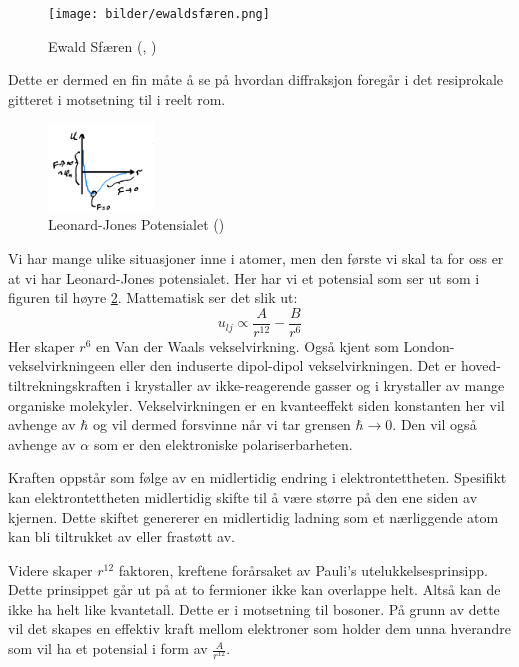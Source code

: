 \documentclass{article}
\begin{document}
\begin{figure}[H]
    \centering
    \texttt{[image: bilder/ewaldsfæren.png]}
    \caption{Ewald Sfæren (\cite{Sebastian}, \cite{researchgate_ewald_sphere})}
    \label{fig:ewaldsfæren}
\end{figure}
Dette er dermed en fin måte å se på hvordan diffraksjon foregår i det resiprokale gitteret i motsetning til i reelt rom.
\nyside
{}
\begin{figure}
    \centering
    \includegraphics[width=0.25\textwidth]{bilder/leonard_jones_potensialet.png}
    \caption{Leonard-Jones Potensialet (\cite{Aleksander})}
    \label{fig:leonard_jones_potensialet}
\end{figure}
Vi har mange ulike situasjoner inne i atomer, men den første vi skal ta for oss er at vi har Leonard-Jones potensialet. Her har vi et potensial som ser ut som i figuren til høyre \ref{fig:leonard_jones_potensialet}. Mattematisk ser det slik ut:
\begin{equation}
    \label{eq:leonard_jones_potensialet}
    u_{lj} \propto \frac{A}{r^{12}} - \frac{B}{r^6}
\end{equation}
Her skaper $r^6$ en Van der Waals vekselvirkning. Også kjent som London-vekselvirkningeen eller den induserte dipol-dipol vekselvirkningen. Det er hoved-tiltrekningskraften i krystaller av ikke-reagerende gasser og i krystaller av mange organiske molekyler. Vekselvirkningen er en kvanteeffekt siden konstanten her vil avhenge av $\hbar$ og vil dermed forsvinne når vi tar grensen $\hbar \rightarrow 0$. Den vil også avhenge av $\alpha$ som er den elektroniske polariserbarheten.

Kraften oppstår som følge av en midlertidig endring i elektrontettheten. Spesifikt kan elektrontettheten midlertidig skifte til å være større på den ene siden av kjernen. Dette skiftet genererer en midlertidig ladning som et nærliggende atom kan bli tiltrukket av eller frastøtt av.

Videre skaper $r^{12}$ faktoren, kreftene forårsaket av Pauli's utelukkelsesprinsipp. Dette prinsippet går ut på at to fermioner ikke kan overlappe helt. Altså kan de ikke ha helt like kvantetall. Dette er i motsetning til bosoner. På grunn av dette vil det skapes en effektiv kraft mellom elektroner som holder dem unna hverandre som vil ha et potensial i form av $\frac{A}{r^{12}}$.
\end{document}
